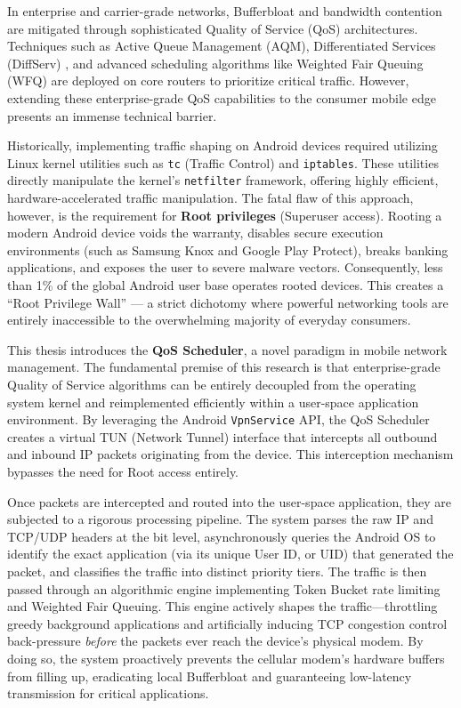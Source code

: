 In enterprise and carrier-grade networks, Bufferbloat and bandwidth contention are mitigated through sophisticated Quality of Service (QoS) architectures. Techniques such as Active Queue Management (AQM), Differentiated Services (DiffServ) \cite{rfc2474}, and advanced scheduling algorithms like Weighted Fair Queuing (WFQ) \cite{demers_1989} are deployed on core routers to prioritize critical traffic. However, extending these enterprise-grade QoS capabilities to the consumer mobile edge presents an immense technical barrier.

Historically, implementing traffic shaping on Android devices required utilizing Linux kernel utilities such as \texttt{tc} (Traffic Control) and \texttt{iptables}. These utilities directly manipulate the kernel's \texttt{netfilter} framework, offering highly efficient, hardware-accelerated traffic manipulation. The fatal flaw of this approach, however, is the requirement for \textbf{Root privileges} (Superuser access). Rooting a modern Android device voids the warranty, disables secure execution environments (such as Samsung Knox and Google Play Protect), breaks banking applications, and exposes the user to severe malware vectors. Consequently, less than 1\% of the global Android user base operates rooted devices. This creates a ``Root Privilege Wall'' --- a strict dichotomy where powerful networking tools are entirely inaccessible to the overwhelming majority of everyday consumers.

This thesis introduces the \textbf{QoS Scheduler}, a novel paradigm in mobile network management. The fundamental premise of this research is that enterprise-grade Quality of Service algorithms can be entirely decoupled from the operating system kernel and reimplemented efficiently within a user-space application environment. By leveraging the Android \texttt{VpnService} API, the QoS Scheduler creates a virtual TUN (Network Tunnel) interface that intercepts all outbound and inbound IP packets originating from the device. This interception mechanism bypasses the need for Root access entirely.

Once packets are intercepted and routed into the user-space application, they are subjected to a rigorous processing pipeline. The system parses the raw IP and TCP/UDP headers at the bit level, asynchronously queries the Android OS to identify the exact application (via its unique User ID, or UID) that generated the packet, and classifies the traffic into distinct priority tiers. The traffic is then passed through an algorithmic engine implementing Token Bucket rate limiting \cite{tanenbaum_2011} and Weighted Fair Queuing. This engine actively shapes the traffic---throttling greedy background applications and artificially inducing TCP congestion control back-pressure \textit{before} the packets ever reach the device's physical modem. By doing so, the system proactively prevents the cellular modem's hardware buffers from filling up, eradicating local Bufferbloat and guaranteeing low-latency transmission for critical applications.

